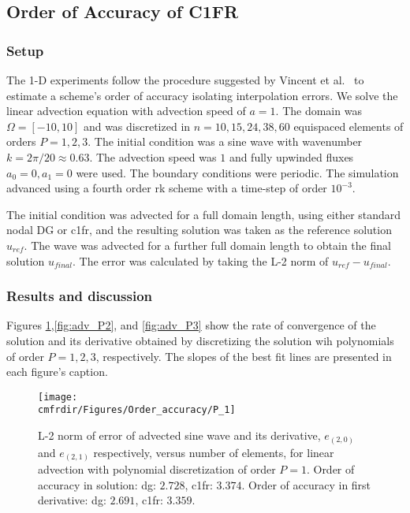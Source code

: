 \subsection{Order of Accuracy of C1FR}
\subsubsection{Setup}

The 1-D experiments follow the procedure suggested by Vincent et al.~\cite{vincent2011insights} to estimate  a scheme's order of accuracy isolating interpolation errors. We solve the linear advection equation with advection speed of $a = 1$. The domain was $\Omega = [-10, 10]$ and was discretized in $n = 10, 15, 24, 38, 60$ equispaced elements of orders $P = 1,2,3$. The initial condition was a sine wave with wavenumber $k = 2\pi/20 \approx 0.63$. The advection speed was $1$ and fully upwinded fluxes $a_0 = 0, a_1 = 0$ were used. The boundary conditions were periodic. The simulation advanced using a fourth order \gls{rk} scheme with a time-step of order $10^{-3}$.

The initial condition was advected for a full domain length, using either standard nodal DG or \gls{c1fr}, and the resulting solution was taken as the reference solution $u_{ref}$. The wave was advected for a further full domain length to obtain the final solution $u_{final}$. The error was calculated by taking the L-2 norm of $u_{ref} - u_{final}$.

\subsubsection{Results and discussion}
Figures \ref{fig:adv_P1},\ref{fig:adv_P2}, and \ref{fig:adv_P3} show the rate of convergence of the solution and its derivative obtained by discretizing the solution wih polynomials of order $P = 1,2,3$, respectively. The slopes of the best fit lines are presented in each figure's caption.

\begin{figure}[h]
\centering\texttt{[image: \\cmfrdir/Figures/Order\_accuracy/P\_1]}
\caption{L-2 norm of error of advected sine wave and its derivative, $e_{(2,0)}$ and $e_{(2,1)}$ respectively, versus number of elements, for linear advection with polynomial discretization of order $P = 1$. Order of accuracy in solution: \gls{dg}: $2.728$, \gls{c1fr}: $3.374$. Order of accuracy in first derivative: \gls{dg}: $2.691$, \gls{c1fr}: $3.359$.}
\label{fig:adv_P1}
\end{figure}

